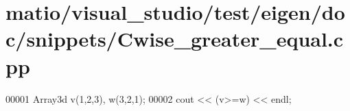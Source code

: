 \hypertarget{matio_2visual__studio_2test_2eigen_2doc_2snippets_2_cwise__greater__equal_8cpp_source}{}\section{matio/visual\+\_\+studio/test/eigen/doc/snippets/\+Cwise\+\_\+greater\+\_\+equal.cpp}
\label{matio_2visual__studio_2test_2eigen_2doc_2snippets_2_cwise__greater__equal_8cpp_source}

\begin{DoxyCode}
00001 Array3d v(1,2,3), w(3,2,1);
00002 cout << (v>=w) << endl;
\end{DoxyCode}
